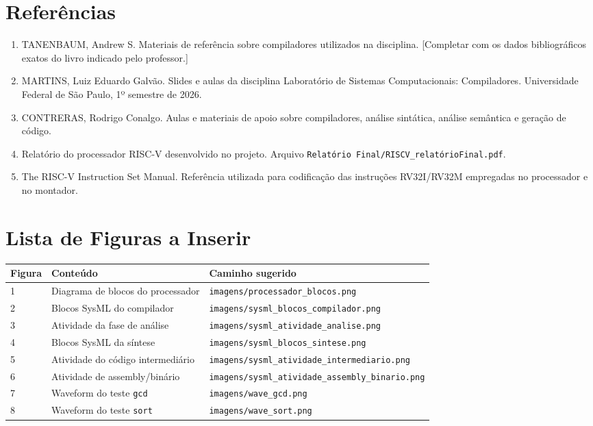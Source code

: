 \documentclass[12pt,a4paper]{report}
\begin{document}
\chapter{Referências}

\begin{enumerate}
    \item TANENBAUM, Andrew S. Materiais de referência sobre compiladores utilizados na disciplina. [Completar com os dados bibliográficos exatos do livro indicado pelo professor.]
    \item MARTINS, Luiz Eduardo Galvão. Slides e aulas da disciplina Laboratório de Sistemas Computacionais: Compiladores. Universidade Federal de São Paulo, 1º semestre de 2026.
    \item CONTRERAS, Rodrigo Conalgo. Aulas e materiais de apoio sobre compiladores, análise sintática, análise semântica e geração de código.
    \item Relatório do processador RISC-V desenvolvido no projeto. Arquivo \texttt{Relatório Final/RISCV\_relatórioFinal.pdf}.
    \item The RISC-V Instruction Set Manual. Referência utilizada para codificação das instruções RV32I/RV32M empregadas no processador e no montador.
\end{enumerate}

\appendix
\chapter{Lista de Figuras a Inserir}

\begin{longtable}{lll}
\toprule
Figura & Conteúdo & Caminho sugerido \\
\midrule
1 & Diagrama de blocos do processador & \texttt{imagens/processador\_blocos.png} \\
2 & Blocos SysML do compilador & \texttt{imagens/sysml\_blocos\_compilador.png} \\
3 & Atividade da fase de análise & \texttt{imagens/sysml\_atividade\_analise.png} \\
4 & Blocos SysML da síntese & \texttt{imagens/sysml\_blocos\_sintese.png} \\
5 & Atividade do código intermediário & \texttt{imagens/sysml\_atividade\_intermediario.png} \\
6 & Atividade de assembly/binário & \texttt{imagens/sysml\_atividade\_assembly\_binario.png} \\
7 & Waveform do teste \texttt{gcd} & \texttt{imagens/wave\_gcd.png} \\
8 & Waveform do teste \texttt{sort} & \texttt{imagens/wave\_sort.png} \\
\bottomrule
\end{longtable}
\end{document}
